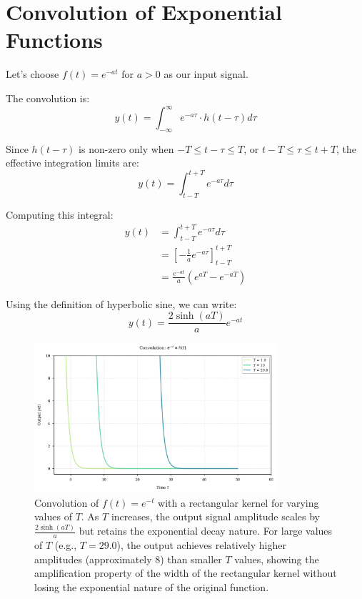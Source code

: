 \section{Convolution of Exponential Functions}
	Let's choose $f(t) = e^{-at}$ for $a > 0$ as our input signal.
	
	The convolution is:
	\begin{equation}
		y(t) = \int_{-\infty}^{\infty} e^{-a\tau} \cdot h(t - \tau) d\tau
	\end{equation}
	
	Since $h(t - \tau)$ is non-zero only when $-T \leq t - \tau \leq T$, or $t - T \leq \tau \leq t + T$, the effective integration limits are:
	\begin{equation}
		y(t) = \int_{t-T}^{t+T} e^{-a\tau} d\tau
	\end{equation}
	
	Computing this integral:
	\begin{align}
		y(t) &= \int_{t-T}^{t+T} e^{-a\tau} d\tau \\
		&= \left[ -\frac{1}{a}e^{-a\tau} \right]_{t-T}^{t+T} \\
		&= \frac{e^{-at}}{a}(e^{aT} - e^{-aT})
	\end{align}
	
	Using the definition of hyperbolic sine, we can write:
	\begin{equation}
		y(t) = \frac{2\sinh(aT)}{a}e^{-at}
	\end{equation}
	
	\begin{figure}[htbp]
		\centering
		\includegraphics[width=0.8\textwidth]{figs/exp_convolution.png}
		\caption{Convolution of $f(t) = e^{-t}$ with a rectangular kernel for varying values of $T$. As $T$ increases, the output signal amplitude scales by $\frac{2\sinh(aT)}{a}$ but retains the exponential decay nature. For large values of $T$ (e.g., $T = 29.0$), the output achieves relatively higher amplitudes (approximately 8) than smaller $T$ values, showing the amplification property of the width of the rectangular kernel without losing the exponential nature of the original function.}
		\label{fig:exp_convolution}
	\end{figure}
	

